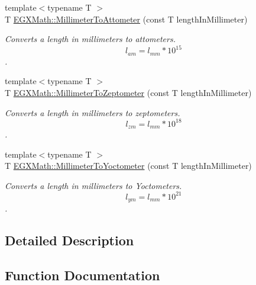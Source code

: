 \begin{DoxyCompactItemize}
{\footnotesize template$<$typename T $>$ }\\T \mbox{\hyperlink{group___e_g_x_math-_conversions-_length_conversions-_millimeter-_s_i_ga4403d88c0af8819b1d6e70057a1457b3}{E\+G\+X\+Math\+::\+Millimeter\+To\+Attometer}} (const T length\+In\+Millimeter)
\begin{DoxyCompactList}\small\item\em Converts a length in millimeters to attometers. \[ l_{am}=l_{mm} * 10^{15} \]. \end{DoxyCompactList}\item 
{\footnotesize template$<$typename T $>$ }\\T \mbox{\hyperlink{group___e_g_x_math-_conversions-_length_conversions-_millimeter-_s_i_ga7973ce559c88b84035d9653e26e4464c}{E\+G\+X\+Math\+::\+Millimeter\+To\+Zeptometer}} (const T length\+In\+Millimeter)
\begin{DoxyCompactList}\small\item\em Converts a length in millimeters to zeptometers. \[ l_{zm}=l_{mm} * 10^{18} \]. \end{DoxyCompactList}\item 
{\footnotesize template$<$typename T $>$ }\\T \mbox{\hyperlink{group___e_g_x_math-_conversions-_length_conversions-_millimeter-_s_i_ga7f8020bb633d6ed2cd874a8c66d2893d}{E\+G\+X\+Math\+::\+Millimeter\+To\+Yoctometer}} (const T length\+In\+Millimeter)
\begin{DoxyCompactList}\small\item\em Converts a length in millimeters to Yoctometers. \[ l_{ym}=l_{mm} * 10^{21} \]. \end{DoxyCompactList}\end{DoxyCompactItemize}


\subsection{Detailed Description}


\subsection{Function Documentation}
\mbox{\label{group___e_g_x_math-_conversions-_length_conversions-_millimeter-_s_i_ga4403d88c0af8819b1d6e70057a1457b3}} 
